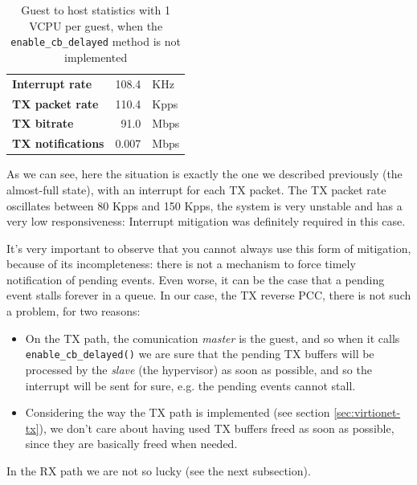 \begin{table}
\begin{center}
\begin{tabular}{lrl}
\toprule
\textbf{Interrupt rate} & 108.4 & KHz\\
\textbf{TX packet rate} & 110.4 & Kpps\\
\textbf{TX bitrate} & 91.0 & Mbps\\
\textbf{TX notifications} & 0.007 & Mbps\\
\bottomrule
\end{tabular}
\end{center}
\caption{Guest to host statistics with 1 VCPU per guest, when the \texttt{enable\_cb\_delayed} method is not implemented}
\label{tab:virtionet-tx-nomit-g2h1vcpu}
\end{table}

As we can see, here the situation is exactly the one we described previously (the almost-full state), with an interrupt for each TX packet.
The TX packet rate oscillates between 80 Kpps and 150 Kpps, the system is very unstable and has a very low responsiveness: Interrupt
mitigation was definitely required in this case.

\vspace{0.5cm}

It's very important to observe that you cannot always use this form of mitigation, because of its incompleteness: there is not a 
mechanism to force timely notification of pending events. Even worse, it can be the case that a pending event stalls forever in a 
queue.
In our case, the TX reverse PCC, there is not such a problem, for two reasons:
\begin{itemize}
  \item On the TX path, the comunication \emph{master} is the guest, and so when it calls \texttt{enable\_cb\_delayed()} we are sure
	that the pending TX buffers will be processed by the \emph{slave} (the hypervisor) as soon as possible, and so the interrupt
	will be sent for sure, e.g. the pending events cannot stall.
	
  \item Considering the way the TX path is implemented (see section \ref{sec:virtionet-tx}), we don't care about having used TX buffers
	freed as soon as possible, since they are basically freed when needed.
\end{itemize}
In the RX path we are not so lucky (see the next subsection).

\vspace{0.5cm}

